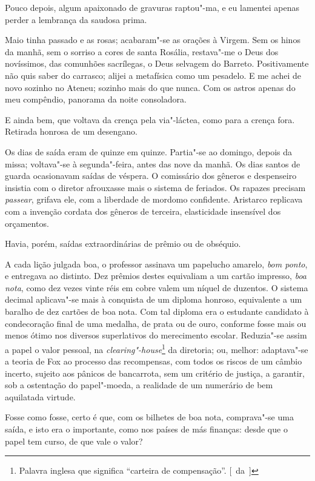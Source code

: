 Pouco depois, algum apaixonado de gravuras raptou"-ma, e eu lamentei
apenas perder a lembrança da saudosa prima. 

Maio tinha passado e as
rosas; acabaram"-se as orações à Virgem. Sem os hinos da manhã, sem o
sorriso a cores de santa Rosália, restava"-me o Deus dos novíssimos,
das comunhões sacrílegas, o Deus selvagem do Barreto. Positivamente não
quis saber do carrasco; alijei a metafísica como um pesadelo. E me
achei de novo sozinho no Ateneu; sozinho mais do que nunca. Com os
astros apenas do meu compêndio, panorama da noite consoladora. 

E ainda bem, que voltava da crença pela via"-láctea, como para a crença fora.
Retirada honrosa de um desengano. 

Os dias de saída eram de quinze em
quinze. Partia"-se ao domingo, depois da missa; voltava"-se à
segunda"-feira, antes das nove da manhã. Os dias santos de guarda
ocasionavam saídas de véspera. O comissário dos gêneros e despenseiro
insistia com o diretor afrouxasse mais o sistema de feriados. Os
rapazes precisam \textit{passear}, grifava ele, com a liberdade de mordomo
confidente. Aristarco replicava com a invenção cordata dos gêneros de
terceira, elasticidade insensível dos orçamentos. 

Havia, porém, saídas extraordinárias de prêmio ou de obséquio.

A cada lição julgada boa, o
professor assinava um papelucho amarelo, \textit{bom ponto}, e entregava ao
distinto. Dez prêmios destes equivaliam a um cartão impresso, \textit{boa nota},
como dez vezes vinte réis em cobre valem um níquel de duzentos. O
sistema decimal aplicava"-se mais à conquista de um diploma honroso,
equivalente a um baralho de dez cartões de boa nota. Com tal diploma
era o estudante candidato à condecoração final de uma medalha, de prata
ou de ouro, conforme fosse mais ou menos ótimo nos diversos
superlativos do merecimento escolar. Reduzia"-se assim a papel o valor
pessoal, na \textit{clearing"-house}\footnote{ Palavra inglesa que significa 
``carteira de compensação''. [~da~]} da diretoria; ou, melhor: adaptava"-se a
teoria de Fox ao processo das recompensas, com todos os riscos de um
câmbio incerto, sujeito aos pânicos de bancarrota, sem um critério de
justiça, a garantir, sob a ostentação do papel"-moeda, a realidade de
um numerário de bem aquilatada virtude. 

Fosse como fosse, certo é que,
com os bilhetes de boa nota, comprava"-se uma saída, e isto era o
importante, como nos países de más finanças: desde que o papel tem
curso, de que vale o valor? 

